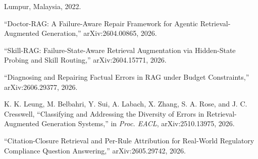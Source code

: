 \documentclass[11pt,a4paper]{article}
\newcommand{\refitem}[2]{%
  \par\noindent\hangindent=19pt\hangafter=1
  \makebox[19pt][l]{[#1]}#2\par}
\begin{document}
{{Lumpur, Malaysia, 2022.}
\refitem{19}{``Doctor-RAG: A Failure-Aware Repair Framework for Agentic
Retrieval-Augmented Generation,'' arXiv:2604.00865, 2026.}
\refitem{20}{``Skill-RAG: Failure-State-Aware Retrieval Augmentation via Hidden-State
Probing and Skill Routing,'' arXiv:2604.15771, 2026.}
\refitem{21}{``Diagnosing and Repairing Factual Errors in RAG under Budget Constraints,''
arXiv:2606.29377, 2026.}
\refitem{22}{K. K. Leung, M. Belbahri, Y. Sui, A. Labach, X. Zhang, S. A. Rose, and
J. C. Cresswell, ``Classifying and Addressing the Diversity of Errors in
Retrieval-Augmented Generation Systems,'' in \textit{Proc. EACL}, arXiv:2510.13975, 2026.}
\refitem{23}{``Citation-Closure Retrieval and Per-Rule Attribution for Real-World
Regulatory Compliance Question Answering,'' arXiv:2605.29742, 2026.}

}
\end{document}
